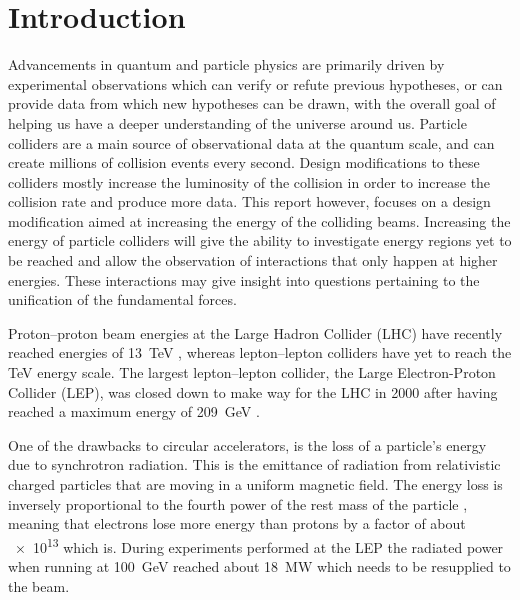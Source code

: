 
\section{Introduction}

Advancements in quantum and particle physics are primarily driven by
experimental observations which can verify or refute previous hypotheses, or can
provide data from which new hypotheses can be drawn, with the overall goal
of helping us have a deeper understanding of the universe around us.
Particle colliders are a main source of observational data at the quantum scale,
and can create millions of collision events every second.  Design modifications
to these colliders mostly increase the luminosity of the collision in order to
increase the collision rate and produce more data.  This report however, focuses
on a design modification aimed at increasing the energy of the colliding beams.
Increasing the energy of particle colliders will give the ability to investigate
energy regions yet to be reached and allow the observation of interactions that
only happen at higher energies. These interactions may give insight into
questions pertaining to the unification of the fundamental forces.


Proton--proton beam energies at the Large Hadron Collider (LHC) have recently
reached energies of \SI{13}{\tera\electronvolt} \cite{CMS:2015bta}, whereas
lepton--lepton colliders have yet to reach the \si{\tera\electronvolt} energy
scale. The largest lepton--lepton collider, the Large Electron-Proton Collider (LEP),
was closed down to make way for the LHC in \num{2000} after having reached a
maximum energy of \SI{209}{\giga\electronvolt} \cite{Barate2003sz}.


One of the drawbacks to circular accelerators,
is the loss of a particle's energy due to synchrotron radiation.  This is the
emittance of radiation from relativistic charged particles that are moving in a
uniform magnetic field. The energy loss is inversely proportional to the fourth
power of the rest mass of the particle \cite{sokolov1966synchrotron}, meaning
that electrons lose more energy than protons by a factor of about \num{e13}
which is.  During experiments performed at the LEP the radiated power when
running at \SI{100}{\giga\electronvolt} reached about \SI{18}{\mega\watt} which
needs to be resupplied to the beam.

